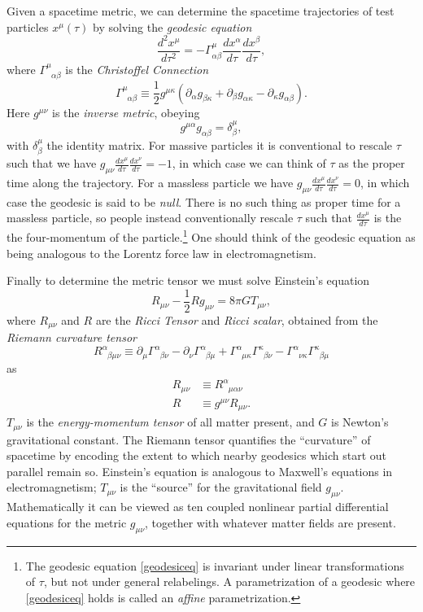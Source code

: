 \documentclass[12pt]{article}
\newcommand{\be}{\begin{equation}}
\newcommand{\ee}{\end{equation}}
\begin{document}
Given a spacetime metric, we can determine the spacetime trajectories of test particles $x^\mu(\tau)$ by solving the \textit{geodesic equation}
\be\label{geodesiceq}
\frac{d^2 x^\mu}{d\tau^2}=-\Gamma^{\mu}_{\alpha\beta}\frac{dx^\alpha}{d\tau} \frac{dx^\beta}{d\tau}, 
\ee
where $\Gamma^\mu_{\phantom{\mu}\alpha\beta}$ is the \textit{Christoffel Connection}
\be
\Gamma^\mu_{\phantom{\mu}\alpha\beta}\equiv \frac{1}{2}g^{\mu \kappa}\left(\partial_\alpha g_{\beta \kappa}+\partial_{\beta}g_{\alpha \kappa}-\partial_\kappa g_{\alpha\beta}\right).
\ee
Here $g^{\mu\nu}$ is the \textit{inverse metric}, obeying
\be
g^{\mu\alpha}g_{\alpha \beta}=\delta^\mu_\beta,
\ee 
with $\delta^\mu_\beta$ the identity matrix.  For massive particles it is conventional to rescale $\tau$ such that we have $g_{\mu\nu}\frac{d x^\mu}{d\tau}\frac{d x^\nu}{d\tau}=-1$, in which case we can think of $\tau$ as the proper time along the trajectory.  For a massless particle we have $g_{\mu\nu}\frac{d x^\mu}{d\tau}\frac{d x^\nu}{d\tau}=0$, in which case the geodesic is said to be \textit{null}.  There is no such thing as proper time for a massless particle, so people instead conventionally rescale $\tau$ such that $\frac{dx^\mu}{d\tau}$ is the the four-momentum of the particle.\footnote{The geodesic equation \ref{geodesiceq} is invariant under linear transformations of $\tau$, but not under general relabelings.  A parametrization of a geodesic where \eqref{geodesiceq} holds is called an \textit{affine} parametrization.}  One should think of the geodesic equation as being analogous to the Lorentz force law in electromagnetism.  

Finally to determine the metric tensor we must solve Einstein's equation
\be
R_{\mu\nu}-\frac{1}{2}R g_{\mu\nu}=8\pi G T_{\mu\nu},
\ee
where $R_{\mu\nu}$ and $R$ are the \textit{Ricci Tensor} and \textit{Ricci scalar}, obtained from the \textit{Riemann curvature tensor}
\be
R^\alpha_{\phantom{\alpha}\beta\mu\nu}\equiv \partial_\mu \Gamma^\alpha_{\phantom{\alpha}\beta\nu}-\partial_\nu \Gamma^\alpha_{\phantom{\alpha}\beta\mu}+\Gamma^\alpha_{\phantom{\alpha}\mu \kappa}\Gamma^\kappa_{\phantom{\kappa}\beta\nu}-\Gamma^\alpha_{\phantom{\alpha} \nu \kappa}\Gamma^\kappa_{\phantom{\kappa}\beta\mu}
\ee
as 
\begin{align}\nonumber
R_{\mu\nu}&\equiv R^\alpha_{\phantom{\alpha}\mu\alpha\nu}\\
R&\equiv g^{\mu\nu}R_{\mu\nu}.
\end{align}
$T_{\mu\nu}$ is the \textit{energy-momentum tensor} of all matter present, and $G$ is Newton's gravitational constant.  The Riemann tensor quantifies the ``curvature'' of spacetime by encoding the extent to which nearby geodesics which start out parallel remain so.  Einstein's equation is analogous to Maxwell's equations in electromagnetism; $T_{\mu\nu}$ is the ``source'' for the gravitational field $g_{\mu\nu}$.  Mathematically it can be viewed as ten coupled nonlinear partial differential equations for the metric $g_{\mu\nu}$, together with whatever matter fields are present.  
\end{document}
